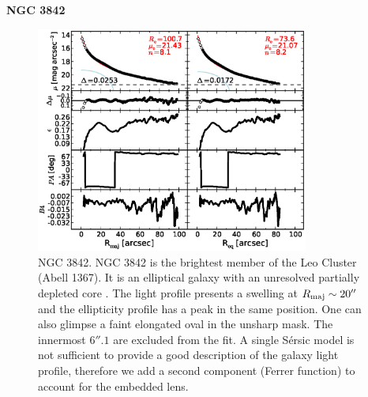 \documentclass[preprint2]{emulateapj}
\newcommand{\fitfigurewidth}{0.8\textwidth}
\begin{document}
  \clearpage\newpage\noindent
  {\bf NGC 3842 \\}
  
  \begin{figure}[h]
  \begin{center}
  \includegraphics[width=\fitfigurewidth]{images/n3842exp_1Dfit.eps}
  \caption{NGC 3842.
  NGC 3842 is the brightest member of the Leo Cluster (Abell 1367).
  It is an elliptical galaxy with an unresolved partially depleted core \citep{rusli2013,dullograham2014cores}. %
  The light profile presents a swelling at $R_{\rm maj} \sim 20''$ and the ellipticity profile has a peak in the same position.
  One can also glimpse a faint elongated oval in the unsharp mask.
  The innermost $6''.1$ are excluded from the fit.
  A single S\'ersic model is not sufficient to provide a good description of the galaxy light profile, 
  therefore we add a second component (Ferrer function) to account for the embedded lens.
  }
  \end{center}
  \end{figure}
\end{document}
